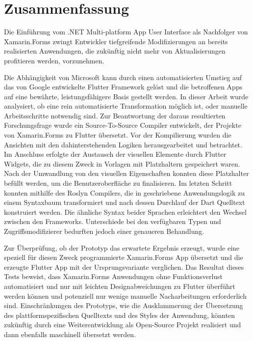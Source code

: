 
\chapter*{Zusammenfassung}
Die Einführung vom .NET Multi-platform App User Interface als Nachfolger von Xamarin.Forms zwingt Entwickler tiefgreifende Modifizierungen an bereits realisierten Anwendungen, die zukünftig nicht mehr von Aktualisierungen profitieren werden, vorzunehmen.

Die Abhängigkeit von Microsoft kann durch einen automatisierten Umstieg auf das von Google entwickelte Flutter Framework gelöst und die betroffenen Apps auf eine bewährte, leistungsfähigere Basis gestellt werden. In dieser Arbeit wurde analysiert, ob eine rein automatisierte Transformation möglich ist, oder manuelle Arbeitsschritte notwendig sind.  Zur Beantwortung der daraus resultierten Forschungsfrage wurde ein Source-To-Source Compiler entwickelt, der Projekte von Xamarin.Forms zu Flutter übersetzt. Vor der  Kompilierung wurden die Ansichten mit den dahinterstehenden Logiken herausgearbeitet und betrachtet.  Im Anschluss erfolgte der Austausch der visuellen Elemente durch Flutter Widgets, die zu diesem Zweck in Vorlagen mit Platzhaltern gespeichert waren. Nach der Umwandlung von den visuellen Eigenschaften konnten diese Platzhalter befüllt werden, um die Benutzeroberfläche zu finalisieren.  Im letzten Schritt konnten mithilfe des Roslyn Compilers, die in \Csharp{} geschriebene Anwendungslogik zu einem Syntaxbaum transformiert und nach dessen Durchlauf der Dart Quelltext konstruiert werden. Die ähnliche Syntax beider Sprachen erleichtert den Wechsel zwischen den Frameworks.  Unterschiede bei den verfügbaren Typen und Zugriffsmodifizierer bedurften jedoch einer genaueren Behandlung.

Zur Überprüfung,  ob der Prototyp das erwartete Ergebnis erzeugt, wurde eine speziell für diesen Zweck programmierte Xamarin.Forms App übersetzt und die erzeugte Flutter App mit der Ursprungsvariante verglichen. Das Resultat dieses Tests beweist, dass Xamarin.Forms Anwendungen ohne Funktionsverlust automatisiert und nur mit leichten Designabweichungen zu Flutter überführt werden können und potenziell nur wenige manuelle Nacharbeitungen erforderlich sind.  Einschränkungen des Prototyps, wie die Ausklammerung der Übersetzung des plattformspezifischen Quelltexts und des Styles der Anwendung, könnten zukünftig durch eine Weiterentwicklung als Open-Source Projekt realisiert und dann ebenfalls maschinell übersetzt werden.



